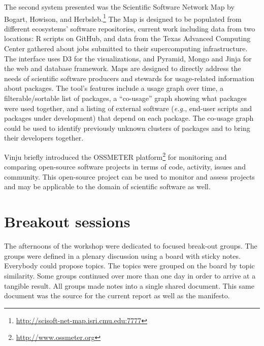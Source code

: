\documentclass[a4paper,UKenglish]{dagrep}
\newcommand{\eg}{\emph{e.g.},\xspace}
\begin{document}
The second system presented was the Scientific Software Network Map by Bogart, Howison, and Herbsleb.\footnote{\url{http://scisoft-net-map.isri.cmu.edu:7777}} The Map is designed to be populated from different ecosystems' software repositories, current work including data from two locations: R scripts on GitHub, and data from the Texas Advanced Computing Center gathered about jobs submitted to their supercomputing infrastructure.  The interface uses D3 for the visualizations, and Pyramid, Mongo and Jinja for the web and database framework. Maps are designed to directly address the needs of scientific software producers and stewards for usage-related information about packages. The tool's features include a usage graph over time, a filterable/sortable list of packages, a ``co-usage'' graph showing what packages were used together, and a listing of external software (\eg end-user scripts and packages under development) that depend on each package. The co-usage graph could be used to identify previously unknown clusters of packages and to bring their developers together.


Vinju briefly introduced the OSSMETER platform\footnote{\url{http://www.ossmeter.org}} for monitoring and comparing open-source software projects in terms of code, activity, issues and community. This open-source project can be used to monitor and assess projects and may be applicable to the domain of scientific software as well.




\section{Breakout sessions}

The afternoons of the workshop were dedicated to focused break-out groups. The groups were defined in a plenary discussion using a board with sticky notes. Everybody could propose topics. The topics were grouped on the board by topic similarity. Some groups continued over more than one day in order to arrive at a tangible result. All groups made notes into a single shared document. This same document was the source for the current report as well as the manifesto.
\end{document}
